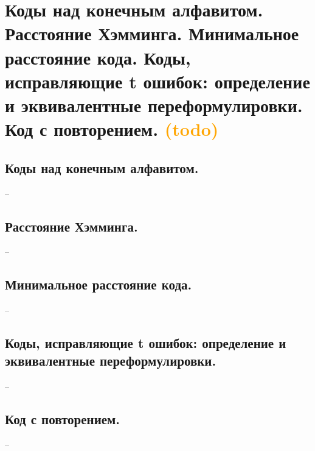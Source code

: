\section{Коды над конечным алфавитом. Расстояние Хэмминга. Минимальное расстояние кода. Коды, исправляющие t ошибок: определение и эквивалентные переформулировки. Код с повторением. \textcolor{orange}{(todo)}}

\subsection{Коды над конечным алфавитом.}
--

\subsection{Расстояние Хэмминга.}
--

\subsection{Минимальное расстояние кода.}
--

\subsection{Коды, исправляющие t ошибок: определение и эквивалентные переформулировки.}
--

\subsection{Код с повторением.}
--

